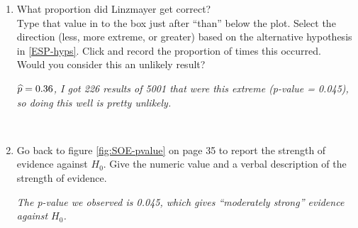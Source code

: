 \begin{enumerate}
     \item What proportion did Linzmayer get correct? \\
           Type that value in to the box just after ``than'' below the
           plot.  Select the direction (less, more extreme, or greater)
           based on the alternative hypothesis in
           \ref{ESP-hyps}. Click  and record the proportion of
           times this occurred.\\  
           Would you consider this an unlikely result?
\begin{students}
  \vspace{1.2cm}
\end{students}
\begin{key}
{\it $\widehat{p} = 0.36$, I got 226 results of 5001 that
  were this extreme (p-value = 0.045), so doing this well is pretty unlikely.}
\end{key}
\\

     \item  Go back to figure \ref{fig:SOE-pvalue} on page 35 to report the
       strength of evidence against $H_0$.  Give the numeric value and a
       verbal description of the strength of evidence.  
\begin{students}
  \vspace{1cm}
\end{students}
\begin{key}
{\it The p-value we observed is 0.045, which gives ``moderately
  strong'' evidence against $H_0$. }
\end{key}
\\
\end{enumerate}





